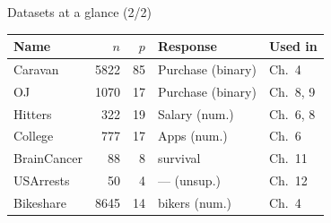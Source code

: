 \documentclass[aspectratio=169,11pt]{beamer}
\begin{document}
\begin{frame}{Datasets at a glance (2/2)}
  \footnotesize
  \begin{tabular}{lrrll}
    \toprule
    \textbf{Name} & $n$ & $p$ & \textbf{Response} & \textbf{Used in} \\
    \midrule
    Caravan      & 5822 &  85 & Purchase (binary)  & Ch.~4 \\
    OJ           & 1070 &  17 & Purchase (binary)  & Ch.~8, 9 \\
    Hitters      &  322 &  19 & Salary (num.)      & Ch.~6, 8 \\
    College      &  777 &  17 & Apps (num.)        & Ch.~6 \\
    BrainCancer  &   88 &   8 & survival           & Ch.~11 \\
    USArrests    &   50 &   4 & --- (unsup.)       & Ch.~12 \\
    Bikeshare    & 8645 &  14 & bikers (num.)      & Ch.~4 \\
    \bottomrule
  \end{tabular}
\end{frame}
\end{document}
